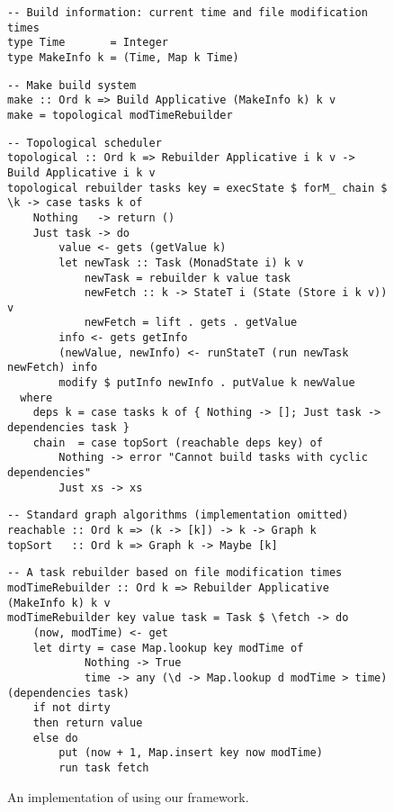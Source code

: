 \begin{figure}
\begin{verbatim}
-- Build information: current time and file modification times
type Time       = Integer
type MakeInfo k = (Time, Map k Time)
\end{verbatim}
\vspace{1mm}
\begin{verbatim}
-- Make build system
make :: Ord k => Build Applicative (MakeInfo k) k v
make = topological modTimeRebuilder
\end{verbatim}
\vspace{1mm}
\begin{verbatim}
-- Topological scheduler
topological :: Ord k => Rebuilder Applicative i k v -> Build Applicative i k v
topological rebuilder tasks key = execState $ forM_ chain $ \k -> case tasks k of
    Nothing   -> return ()
    Just task -> do
        value <- gets (getValue k)
        let newTask :: Task (MonadState i) k v
            newTask = rebuilder k value task
            newFetch :: k -> StateT i (State (Store i k v)) v
            newFetch = lift . gets . getValue
        info <- gets getInfo
        (newValue, newInfo) <- runStateT (run newTask newFetch) info
        modify $ putInfo newInfo . putValue k newValue
  where
    deps k = case tasks k of { Nothing -> []; Just task -> dependencies task }
    chain  = case topSort (reachable deps key) of
        Nothing -> error "Cannot build tasks with cyclic dependencies"
        Just xs -> xs
\end{verbatim}
\vspace{1mm}
\begin{verbatim}
-- Standard graph algorithms (implementation omitted)
reachable :: Ord k => (k -> [k]) -> k -> Graph k
topSort   :: Ord k => Graph k -> Maybe [k]
\end{verbatim}
\vspace{1mm}
\begin{verbatim}
-- A task rebuilder based on file modification times
modTimeRebuilder :: Ord k => Rebuilder Applicative (MakeInfo k) k v
modTimeRebuilder key value task = Task $ \fetch -> do
    (now, modTime) <- get
    let dirty = case Map.lookup key modTime of
            Nothing -> True
            time -> any (\d -> Map.lookup d modTime > time) (dependencies task)
    if not dirty
    then return value
    else do
        put (now + 1, Map.insert key now modTime)
        run task fetch
\end{verbatim}
\vspace{-2mm}
\caption{An implementation of \Make using our framework.}\label{fig-make-implementation}
\vspace{-2mm}
\end{figure}

